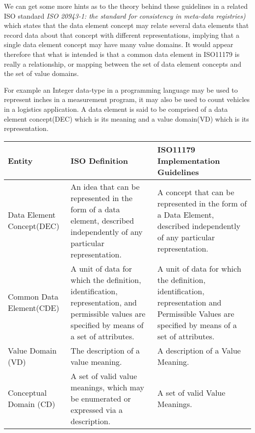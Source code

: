 We can get some more hints as to the theory behind these guidelines in a related ISO standard \emph{ISO 20943-1: the standard for consistency in meta-data registries)} which states that the data element concept may relate several data elements that record data about that concept with different representations, implying that a single data element concept may have many value domains. It would appear therefore that what is intended is that a common data element in ISO11179 is really a relationship, or mapping between the set of data element concepts and the set of value domains. 

For example an Integer data-type in a programming language may be used to represent inches in a measurement program, it may also be used to count vehicles in a logistics application.  A data element is said to be comprised of a data element concept(DEC) which is its meaning and a value domain(VD) which is its representation.


\begin{table}[h]
	\begin{tabular}{ p{1.8cm} p{2.8cm}  p{3.0cm}  }  %
		\hline
		Entity & ISO Definition & ISO11179 Implementation Guidelines  \\ 
		\hline
		Data Element Concept(DEC) & An idea that can be represented in the form of a data element, described independently of any particular representation. & A concept that can be represented in the form of a Data Element, described independently of any particular representation.\\
		Common Data Element(CDE) & A unit of data for which the definition, identification, representation, and permissible values are specified by means of a set of attributes. & A unit of data for which the definition, identification, representation and Permissible Values are specified by means of a set of attributes. \\
		Value Domain (VD) & The description of a value meaning. & A description of a Value Meaning. \\
		Conceptual Domain (CD) & A set of valid value meanings, which may be enumerated or expressed via a description.& A set of valid Value Meanings.\\
		\hline
	\end{tabular}
\end{table}

\vspace{5.mm}


